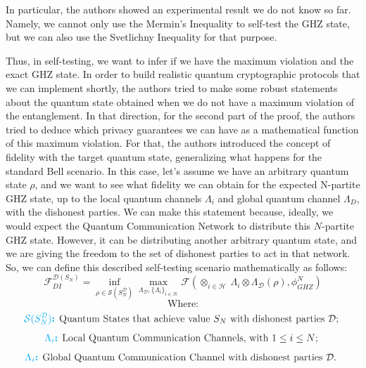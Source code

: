 \documentclass[12pt]{article}
\begin{document}
    \noindent In particular, the authors showed an experimental result we do not know so far. Namely, we cannot only use the Mermin's Inequality to self-test the GHZ state, but we can also use the Svetlichny Inequality for that purpose.

    \noindent Thus, in self-testing, we want to infer if we have the maximum violation and the exact GHZ state. In order to build realistic quantum cryptographic protocols that we can implement shortly, the authors tried to make some robust statements about the quantum state obtained when we do not have a maximum violation of the entanglement. In that direction, for the second part of the proof, the authors tried to deduce which privacy guarantees we can have as a mathematical function of this maximum violation. For that, the authors introduced the concept of fidelity with the target quantum state, generalizing what happens for the standard Bell scenario. In this case, let's assume we have an arbitrary quantum state $\rho$, and we want to see what fidelity we can obtain for the expected N-partite GHZ state, up to the local quantum channels ${\Lambda}_{i}$ and global quantum channel ${\Lambda}_{D}$, with the dishonest parties. We can make this statement because, ideally, we would expect the Quantum Communication Network to distribute this $N$-partite GHZ state. However, it can be distributing another arbitrary quantum state, and we are giving the freedom to the set of dishonest parties to act in that network. So, we can define this described self-testing scenario mathematically as follows:
    $$ {\mathcal{F}}_{DI}^{\mathcal{D} ({S}_{N})} = \inf_{\rho \in \mathcal{S} \left( {S}_{N}^{\mathcal{D}} \right) } \max_{{\Lambda}_{\mathcal{D}}, {\{ {\Lambda}_{i} \}}_{i \in \mathcal{H}} } \mathcal{F}\left( {\otimes}_{i \in \mathcal{H}}\ {\Lambda}_{i} \otimes {\Lambda}_{\mathcal{D}} ( \rho ), {\phi}_{GHZ}^{N} \right) $$
    $$ \mathrm{\text{Where:}} $$
    $$ \mathrm{\text{\color{Cyan} \textbf{$\mathcal{S}( {S}_{N}^{\mathcal{D}} )$:} \color{Black} Quantum States that achieve value ${S}_{N}$ with dishonest parties $\mathcal{D}$; }} $$
    $$ \mathrm{\text{\color{Cyan} \textbf{${\Lambda}_{i}$:} \color{Black} Local Quantum Communication Channels, with $1 \leq i \leq N$; }} $$
    $$ \mathrm{\text{\color{Cyan} \textbf{${\Lambda}_{i}$:} \color{Black} Global Quantum Communication Channel with dishonest parties $\mathcal{D}$. }} $$
    
\end{document}
